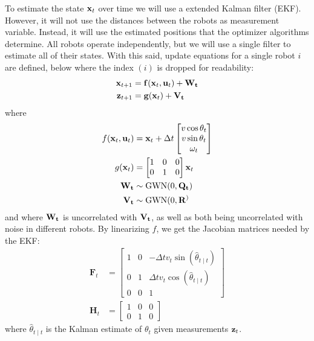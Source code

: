 To estimate the state $\totstate$ over time we will use a extended Kalman filter (EKF). However, it will not use the distances between the robots as measurement variable. Instead, it will use the estimated positions that the optimizer algorithms determine. All robots operate independently, but we will use a single filter to estimate all of their states. With this said, update equations for a single robot $i$ are defined, below where the index $(i)$ is dropped for readability:
\begin{align}
    \totstate[t+1] &= \f(\totstate, \totu) + \W \\
    \totmeas[t+1] &= \g(\totstate) + \V
\end{align}
where
\begin{align}
    f(\totstate, \totu) &= \totstate +\Delta t
    \begin{bmatrix} 
        v \cos \theta_t \\ v \sin \theta_t \\ \omega_t
    \end{bmatrix}\\
    g(\totstate) &= \begin{bmatrix}
        1 & 0 & 0 \\
        0 & 1 & 0
    \end{bmatrix} \totstate \\
    \W &\sim \text{GWN} (0, \Q) \\
    \V &\sim \text{GWN} (0, \R) 
\end{align}
and where $\W$ is uncorrelated with $\V$, as well as both being uncorrelated with noise in different robots. By linearizing $f$, we get the Jacobian matrices needed by the EKF:
\begin{align}
    \mathbf{F}_t &=\begin{bmatrix}
        1 & 0 & -\Delta t v_{t} \sin(\hat{\theta}_{t \mid t}) \\
        0 & 1 & \Delta t v_{t} \cos(\hat{\theta}_{t \mid t}) \\
        0 & 0 & 1
    \end{bmatrix} \\
    \mathbf{H}_t &= \begin{bmatrix}
        1 & 0 & 0 \\
        0 & 1 & 0
    \end{bmatrix}
\end{align}
where $\hat{\theta}_{t \mid t}$ is the Kalman estimate of $\theta_t$ given measurements $\totmeas$.

